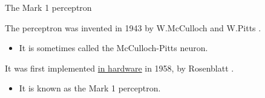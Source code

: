 \begin{frame}[t]{The Mark 1 perceptron}

    The perceptron was invented in 1943 
    by W.McCulloch and W.Pitts \cite{McCulloch:1943p}.
    \begin{itemize}
      \item It is sometimes called the \gls{McCulloch-Pitts neuron}.
    \end{itemize}

    It was first implemented \underline{in hardware} in 1958, 
    by \gls{Rosenblatt} \cite{Rosenblatt:1958p}.
    \begin{itemize}
        \item It is known as the \gls{Mark 1 perceptron}.
      \end{itemize}
  

\end{frame}
